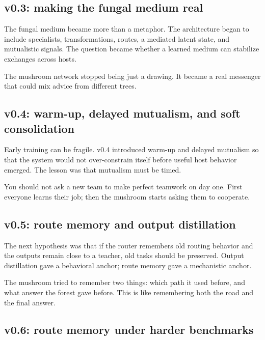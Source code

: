 \documentclass[11pt]{article}
\begin{document}
\subsection{v0.3: making the fungal medium real}

The fungal medium became more than a metaphor. The architecture began to include specialists, transformations, routes, a mediated latent state, and mutualistic signals. The question became whether a learned medium can stabilize exchanges across hosts.

\begin{kidbox}
The mushroom network stopped being just a drawing. It became a real messenger that could mix advice from different trees.
\end{kidbox}

\subsection{v0.4: warm-up, delayed mutualism, and soft consolidation}

Early training can be fragile. v0.4 introduced warm-up and delayed mutualism so that the system would not over-constrain itself before useful host behavior emerged. The lesson was that mutualism must be timed.

\begin{kidbox}
You should not ask a new team to make perfect teamwork on day one. First everyone learns their job; then the mushroom starts asking them to cooperate.
\end{kidbox}

\subsection{v0.5: route memory and output distillation}

The next hypothesis was that if the router remembers old routing behavior and the outputs remain close to a teacher, old tasks should be preserved. Output distillation gave a behavioral anchor; route memory gave a mechanistic anchor.

\begin{kidbox}
The mushroom tried to remember two things: which path it used before, and what answer the forest gave before. This is like remembering both the road and the final answer.
\end{kidbox}

\subsection{v0.6: route memory under harder benchmarks}
\end{document}
